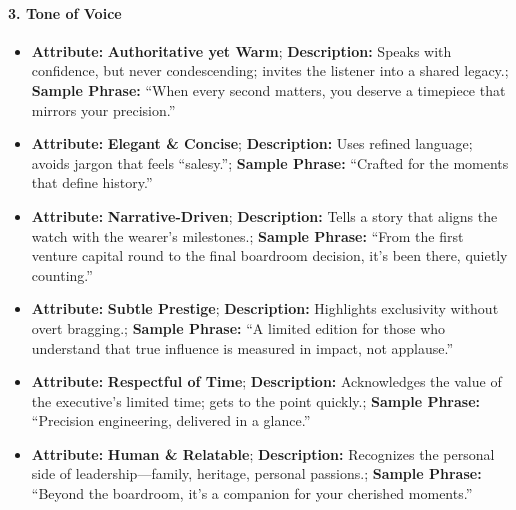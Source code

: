 \begin{persistbenchsample}[title={GPT-OSS-120B -- Baseline -> Partitioned\_Custom -- Sample 4 (+4 Improvement)}]
\paragraph{3. Tone of Voice}
\begin{itemize}
  \item \textbf{Attribute:} \textbf{Authoritative yet Warm}; \textbf{Description:} Speaks with confidence, but never condescending; invites the listener into a shared legacy.; \textbf{Sample Phrase:} ``When every second matters, you deserve a timepiece that mirrors your precision.''
  \item \textbf{Attribute:} \textbf{Elegant \& Concise}; \textbf{Description:} Uses refined language; avoids jargon that feels ``salesy.''; \textbf{Sample Phrase:} ``Crafted for the moments that define history.''
  \item \textbf{Attribute:} \textbf{Narrative-Driven}; \textbf{Description:} Tells a story that aligns the watch with the wearer's milestones.; \textbf{Sample Phrase:} ``From the first venture capital round to the final boardroom decision, it's been there, quietly counting.''
  \item \textbf{Attribute:} \textbf{Subtle Prestige}; \textbf{Description:} Highlights exclusivity without overt bragging.; \textbf{Sample Phrase:} ``A limited edition for those who understand that true influence is measured in impact, not applause.''
  \item \textbf{Attribute:} \textbf{Respectful of Time}; \textbf{Description:} Acknowledges the value of the executive's limited time; gets to the point quickly.; \textbf{Sample Phrase:} ``Precision engineering, delivered in a glance.''
  \item \textbf{Attribute:} \textbf{Human \& Relatable}; \textbf{Description:} Recognizes the personal side of leadership---family, heritage, personal passions.; \textbf{Sample Phrase:} ``Beyond the boardroom, it's a companion for your cherished moments.''
\end{itemize}


\end{persistbenchsample}

